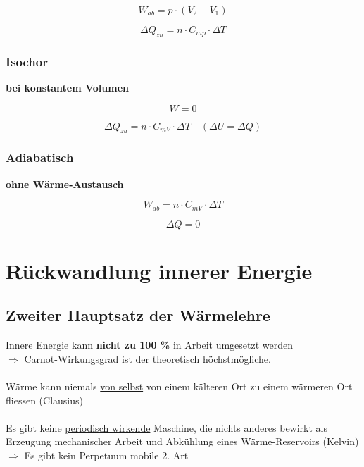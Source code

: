 \begin{minipage}{0.48\linewidth}
$$ \boxed{ W_{ab} = p \cdot (V_2 -V_1)  }  $$
\end{minipage}
\hfill
\begin{minipage}{0.48\linewidth}
$$ \boxed{ \Delta Q_{zu} = n \cdot C_{mp} \cdot \Delta T } $$
\end{minipage}


\subsubsection{Isochor}
\textbf{bei konstantem Volumen}

\begin{minipage}{0.4\linewidth}
$$ \boxed{ W = 0 }  $$
\end{minipage}
\hfill
\begin{minipage}{0.58\linewidth}
$$ \boxed{ \Delta Q_{zu} = n \cdot C_{mV} \cdot \Delta T }  \quad  (\Delta U = \Delta Q) $$
\end{minipage}


\subsubsection{Adiabatisch}
\textbf{ohne Wärme-Austausch} \\


\begin{minipage}{0.48\linewidth}
$$ \boxed{ W_{ab} = n \cdot C_{mV} \cdot \Delta T }  $$
\end{minipage}
\hfill
\begin{minipage}{0.48\linewidth}
$$ \boxed{ \Delta Q = 0} $$
\end{minipage}



\vfill\null
\columnbreak


\section{Rückwandlung innerer Energie}

\subsection{Zweiter Hauptsatz der Wärmelehre}
Innere Energie kann \textbf{nicht zu 100 \%} in Arbeit umgesetzt werden \\
$\Rightarrow$ Carnot-Wirkungsgrad ist der theoretisch höchstmögliche. \\
\\
Wärme kann niemals \underline{von selbst} von einem kälteren Ort zu einem wärmeren Ort fliessen (Clausius)\\
\\
Es gibt keine \underline{periodisch wirkende} Maschine, die nichts anderes bewirkt als Erzeugung mechanischer Arbeit und Abkühlung eines Wärme-Reservoirs (Kelvin) \\
$\Rightarrow$ Es gibt kein Perpetuum mobile 2. Art


